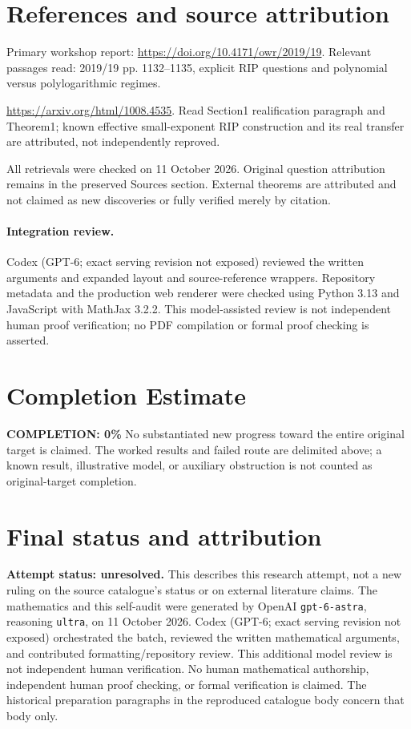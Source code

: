 \documentclass[11pt]{article}
\begin{document}
\section{References and source attribution}
Primary workshop report: \url{https://doi.org/10.4171/owr/2019/19}. Relevant passages read: 2019/19 pp. 1132--1135, explicit RIP questions and polynomial versus polylogarithmic regimes.

\url{https://arxiv.org/html/1008.4535}. Read Section1 realification paragraph and Theorem1; known effective small-exponent RIP construction and its real transfer are attributed, not independently reproved.

All retrievals were checked on 11 October 2026. Original question attribution remains in the preserved Sources section. External theorems are attributed and not claimed as new discoveries or fully verified merely by citation.


\paragraph{Integration review.} Codex (GPT-6; exact serving revision not exposed) reviewed the written arguments and expanded layout and source-reference wrappers. Repository metadata and the production web renderer were checked using Python 3.13 and JavaScript with MathJax 3.2.2. This model-assisted review is not independent human proof verification; no PDF compilation or formal proof checking is asserted.

\section{Completion Estimate}
\noindent\textbf{COMPLETION: 0\%}
No substantiated new progress toward the entire original target is claimed. The worked results and failed route are delimited above; a known result, illustrative model, or auxiliary obstruction is not counted as original-target completion.

\section{Final status and attribution}
\textbf{Attempt status: unresolved.} This describes this research attempt, not a new ruling on the source catalogue's status or on external literature claims.
The mathematics and this self-audit were generated by OpenAI \texttt{gpt-6-astra}, reasoning \texttt{ultra}, on 11 October 2026. Codex (GPT-6; exact serving revision not exposed) orchestrated the batch, reviewed the written mathematical arguments, and contributed formatting/repository review. This additional model review is not independent human verification. No human mathematical authorship, independent human proof checking, or formal verification is claimed. The historical preparation paragraphs in the reproduced catalogue body concern that body only.
\end{document}
